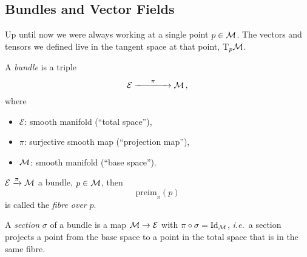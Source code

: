 \documentclass[11pt, a4paper, twocolumn]{article} %
\begin{document}
\subsection{Bundles and Vector Fields}
Up until now we were always working at a single point $p\in \mathcal{M}$.
The vectors and tensors we defined live in the tangent space at that point, $\T_p\M$.
\begin{defn}[Bundle]
    A \textit{bundle} is a triple
    \begin{equation}
        \mathcal{E} \xrightarrow{\phantom{asfd}\pi\phantom{asdf}} \mathcal{M}\,,
    \end{equation}
    where
    \begin{itemize}
        \item $\mathcal{E}$: smooth manifold (``total space''),
        \item $\pi$: surjective smooth map (``projection map''),
        \item $\mathcal{M}$: smooth manifold (``base space'').
    \end{itemize}
\end{defn}
\begin{defn}[Fibre]
    $\mathcal{E} \xrightarrow{\pi} \mathcal{M}$ a bundle, $p\in\mathcal{M}$, then
    \begin{equation}
        \mathrm{preim}_\pi({p})
    \end{equation}
    is called the \textit{fibre over} $p$.
\end{defn}
\begin{defn}
    \label{def:section}
    A \textit{section} $\sigma$ of a bundle is a map $\mathcal{M}\to\mathcal{E}$
    with $\pi\circ\sigma = \mathrm{Id}_{\mathcal{M}}$, \textit{i.e.}\
    a section projects a point from the base space to a point in the total space
    that is in the same fibre.
\end{defn}
\begin{center}
\end{center}
\end{document}
